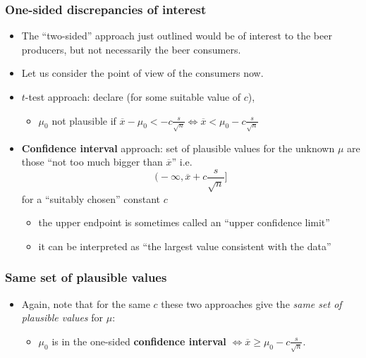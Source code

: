 \documentclass[a4paper]{article}
\begin{document}
\subsubsection{One-sided discrepancies of interest}
\begin{itemize}
	\item The ``two-sided'' approach just outlined would be of interest to the beer producers, but not necessarily the beer consumers.
	\item Let us consider the point of view of the consumers now.
	\item \( t \)-test approach: declare (for some suitable value of \( c \)),
	\begin{itemize}
		\item \( \mu_0 \) \textcolor{mygreen}{not plausible} if \( \overline{x} - \mu_0 < -c \frac{s}{\sqrt{n}} \Leftrightarrow \overline{x} < \mu_0 - c \frac{s}{\sqrt{n}} \) 
	\end{itemize}
	\item \textcolor{myred}{\textbf{Confidence interval}} approach: set of plausible values for the unknown \( \mu \) are those ``not too much bigger than \( \overline{x} \)'' i.e.
	\[
		\bigg( -\infty, \overline{x} + c \frac{s}{\sqrt{n}} \bigg]
	\]
	for a ``suitably chosen'' constant \( c \) 
	\begin{itemize}
		\item the upper endpoint is sometimes called an ``upper confidence limit''
		\item it can be interpreted as ``the largest value consistent with the data''
	\end{itemize}
\end{itemize}
\subsubsection{Same set of plausible values}
\begin{itemize}
	\item Again, note that for the same \( c \) these two approaches give the \textit{same set of plausible values} for \( \mu \):
	\begin{itemize}
		\item \( \mu_0 \) is in the one-sided \textcolor{myred}{\textbf{confidence interval}} \( \Leftrightarrow \overline{x} \geq \mu_0 - c \frac{s}{\sqrt{n}} \).
	\end{itemize}
\end{itemize}
\end{document}

